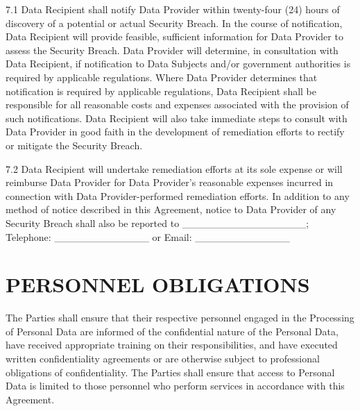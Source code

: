 7.1 Data Recipient shall notify Data Provider within twenty-four (24) hours of discovery of a potential or actual Security Breach. In the course of notification, Data Recipient will provide feasible, sufficient information for Data Provider to assess the Security Breach. Data Provider will determine, in consultation with Data Recipient, if notification to Data Subjects and/or government authorities is required by applicable regulations. Where Data Provider determines that notification is required by applicable regulations, Data Recipient shall be responsible for all reasonable costs and expenses associated with the provision of such notifications. Data Recipient will also take immediate steps to consult with Data Provider in good faith in the development of remediation efforts to rectify or mitigate the Security Breach.

7.2 Data Recipient will undertake remediation efforts at its sole expense or will reimburse Data Provider for Data Provider's reasonable expenses incurred in connection with Data Provider-performed remediation efforts. In addition to any method of notice described in this Agreement, notice to Data Provider of any Security Breach shall also be reported to \_\_\_\_\_\_\_\_\_\_\_\_\_\_\_\_\_; Telephone: \_\_\_\_\_\_\_\_\_\_\_\_\_ or Email: \_\_\_\_\_\_\_\_\_\_\_\_\_



\section{PERSONNEL OBLIGATIONS}

The Parties shall ensure that their respective personnel engaged in the Processing of Personal Data are informed of the confidential nature of the Personal Data, have received appropriate training on their responsibilities, and have executed written confidentiality agreements or are otherwise subject to professional obligations of confidentiality. The Parties shall ensure that access to Personal Data is limited to those personnel who perform services in accordance with this Agreement.

